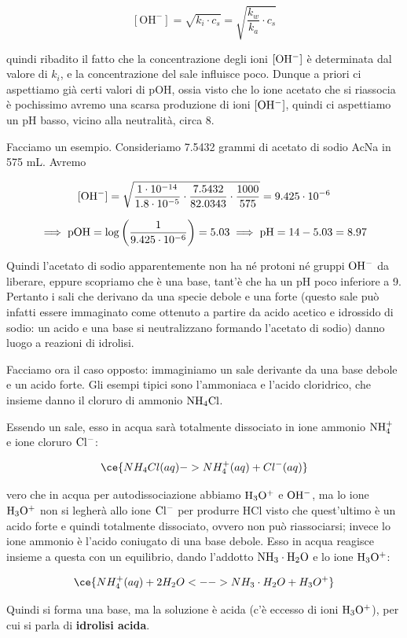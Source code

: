 $$[\text{OH}^-]=\sqrt{k_i \cdot c_s}=\sqrt{\frac{k_w}{k_a}\cdot c_s}$$

\E quindi ribadito il fatto che la concentrazione degli ioni $\rm [OH^-]$ è determinata dal valore di $k_i$, e la concentrazione del sale influisce poco. Dunque a priori ci aspettiamo già certi valori di pOH, ossia visto che lo ione acetato che si riassocia è pochissimo avremo una scarsa produzione di ioni $\rm [OH^-]$, quindi ci aspettiamo un pH basso, vicino alla neutralità, circa 8.

Facciamo un esempio. Consideriamo 7.5432 grammi di acetato di sodio AcNa in 575 mL. Avremo

$$\rm [OH^-]=\sqrt{\frac{1 \cdot 10^{-14}}{1.8 \cdot 10^{-5}}\cdot \frac{7.5432}{82.0343} \cdot \frac{1000}{575}}=9.425 \cdot 10^{-6}$$

$$\implies \rm pOH = \log \left( \frac{1}{9.425 \cdot 10^{-6}} \right)=5.03 \implies pH= 14-5.03=8.97$$

Quindi l'acetato di sodio apparentemente non ha né protoni né gruppi $\rm OH^-$ da liberare, eppure scopriamo che è una base, tant'è che ha un pH poco inferiore a 9. Pertanto i sali che derivano da una specie debole e una forte (questo sale può infatti essere immaginato come ottenuto a partire da acido acetico e idrossido di sodio: un acido e una base si neutralizzano formando l'acetato di sodio) danno luogo a reazioni di idrolisi.

\vspace{0.4cm}Facciamo ora il caso opposto: immaginiamo un sale derivante da una base debole e un acido forte. Gli esempi tipici sono l'ammoniaca e l'acido cloridrico, che insieme danno il cloruro di ammonio $\rm NH_4Cl$.

Essendo un sale, esso in acqua sarà totalmente dissociato in ione ammonio $\rm NH_4^+$ e ione cloruro $\rm Cl^-$:

$$\ce{NH_4Cl(aq) -> NH_4^+(aq) + Cl^-(aq)}$$

\E vero che in acqua per autodissociazione abbiamo $\rm H_3O^+$ e $\rm OH^-$, ma lo ione $\rm H_3O^+$ non si legherà allo ione $\rm Cl^-$ per produrre HCl visto che quest'ultimo è un acido forte e quindi totalmente dissociato, ovvero non può riassociarsi; invece lo ione ammonio è l'acido coniugato di una base debole. Esso in acqua reagisce insieme a questa con un equilibrio, dando l'addotto $\rm NH_3 \cdot H_2O$ e lo ione $\rm H_3O^+$:

$$\ce{NH_4^+(aq) + 2H_2O <--> NH_3 \cdot H_2O + H_3O^+}$$

Quindi si forma una base, ma la soluzione è acida (c'è eccesso di ioni $\rm H_3O^+$), per cui si parla di \textbf{idrolisi acida}.

